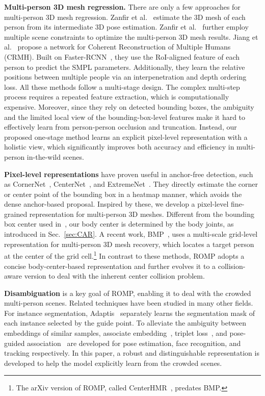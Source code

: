 \documentclass[10pt,twocolumn,letterpaper]{article}
\begin{document}
\textbf{Multi-person 3D mesh regression.} 
There are only a few approaches for multi-person 3D mesh regression. 
Zanfir et al.~\cite{zanfir2018deep} estimate the 3D mesh of each person from its intermediate 3D pose estimation.
Zanfir et al.~\cite{zanfir2018monocular} further employ multiple scene constraints to optimize the multi-person 3D mesh results. 
Jiang et al.~\cite{jiang2020coherent} propose a network for Coherent Reconstruction of Multiple Humans (CRMH).
Built on Faster-RCNN~\cite{ren2015fasterrcnn}, they use the RoI-aligned feature of each person to predict the SMPL parameters. 
Additionally, they learn the relative positions between multiple people via an interpenetration and depth ordering loss.
All these methods follow a multi-stage design.
The complex multi-step process requires a repeated feature extraction, which is computationally expensive. 
Moreover, since they rely on detected bounding boxes, the ambiguity and the limited local view of the bounding-box-level features make it hard to effectively learn from person-person occlusion and truncation.
Instead, our proposed one-stage method learns an explicit pixel-level representation with a holistic view, which significantly improves both accuracy and efficiency in multi-person in-the-wild scenes. 
    
 \textbf{Pixel-level representations} have proven useful in anchor-free detection, such as CornerNet~\cite{law2018cornernet}, CenterNet~\cite{duan2019centernet,zhou2019objects}, and ExtremeNet~\cite{ExtremeNet}.
They directly estimate the corner or center point of the bounding box in a heatmap manner, which avoids the dense anchor-based proposal.
Inspired by these, we develop a pixel-level fine-grained representation for multi-person 3D meshes.
Different from the bounding box center used in~\cite{zhou2019objects}, our body center is determined by the body joints, as introduced in Sec.~\ref{sec:CAR}. 
A recent work, BMP~\cite{zhang2021bmp}, uses a multi-scale grid-level representation for multi-person 3D mesh recovery, which locates a target person at the center of the grid cell.\footnote{The arXiv version of ROMP, called CenterHMR~\cite{centerhmr}, predates BMP.}
In contrast to these methods, ROMP adopts a concise body-center-based representation and further evolves it to a collision-aware version to deal with the inherent center collision problem. 


\textbf{Disambiguation} is a key goal of ROMP, enabling it to  deal with the crowded multi-person scenes. Related techniques have been studied in many other fields. For instance segmentation, Adaptis~\cite{sofiiuk2019adaptis} separately learns the segmentation mask of each instance selected by the guide point. 
To alleviate the ambiguity between embeddings of similar samples, associate embedding~\cite{newell2017associative}, triplet loss~\cite{tripletloss}, and pose-guided association~\cite{bao2020pose} are developed for pose estimation, face recognition, and tracking respectively. 
In this paper, a robust and distinguishable representation is developed to help the model explicitly learn from the crowded scenes.
\end{document}
